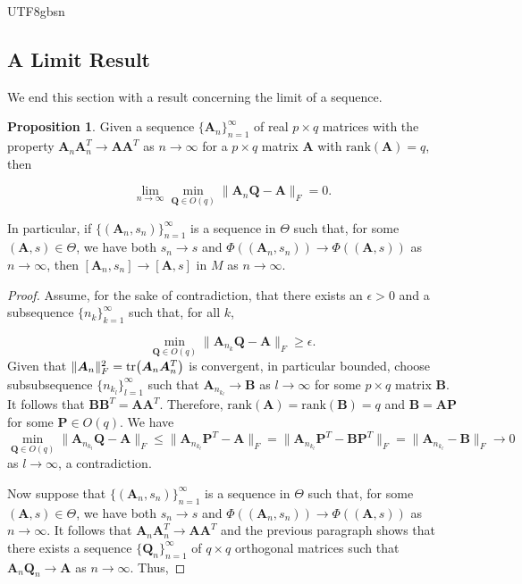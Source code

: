 \documentclass[12pt]{report}
\theoremstyle{plain}
\theoremstyle{definition}
\newtheorem{proposition}[theorem]{Proposition}
\begin{document}
\begin{CJK*}{UTF8}{gbsn}
\subsection{A Limit Result}
We end this section with a result concerning the limit of a sequence.

\begin{proposition}\label{thm:quotient_limit}
Given a sequence 
$\{\bm{A}_n\}_{n=1}^{\infty}$
of real $p \times q$ matrices
with the property $\bm{A}_n\bm{A}_n^T \to \bm{A}\bm{A}^T$
as $n \to \infty$
for a $p \times q$ matrix $\bm{A}$
with $\text{rank}(\bm{A}) = q$, 
then 

\begin{equation*}
  \lim_{n \to \infty} \min_{\bm{Q} \in O(q)} \|\bm{A}_n\bm{Q}- \bm{A}\|_F = 0.
\end{equation*}

In particular, if $\{(\bm{A}_n, s_n)\}_{n=1}^{\infty}$
is a sequence in $\Theta$ 
such that, for some $(\bm{A}, s) \in \Theta$,
we have both $s_n \to s$ and 
$\Phi((\bm{A}_n, s_n)) 
\to \Phi((\bm{A}, s))$ as $n \to \infty$,
then $[\bm{A}_n, s_n] \to [\bm{A}, s]$ in $M$ as $n \to \infty$.
\end{proposition}

\begin{proof}
Assume, for the sake of contradiction,
that there exists an $\epsilon > 0$ and a subsequence $\{n_k\}_{k=1}^{\infty}$
such that, for all $k$,

\begin{equation*}
  \min_{\bm{Q} \in O(q)} \|\bm{A}_{n_k}\bm{Q}- \bm{A}\|_F \geqslant \epsilon.
\end{equation*}
Given that $\|\bm{A}_{n}\|_F^2 = \tr(\bm{A}_{n}\bm{A}_{n}^T)$
is convergent, in particular bounded, 
choose subsubsequence $\{n_{k_l}\}_{l=1}^{\infty}$
such that $\bm{A}_{n_{k_l}} \to \bm{B}$ as $l \to \infty$
for some $p \times q$ matrix $\bm{B}$.
It follows that $\bm{B}\bm{B}^T = \bm{A}\bm{A}^T$.
Therefore, $\text{rank}(\bm{A}) = \text{rank}(\bm{B}) = q$
and $\bm{B} = \bm{A}\bm{P}$ for some $\bm{P} \in O(q)$.
We have 
\begin{equation*}
  \min_{\bm{Q} \in O(q)} \|\bm{A}_{n_{k_l}}\bm{Q}- \bm{A}\|_F \leqslant 
  \|\bm{A}_{n_{k_l}}\bm{P}^T- \bm{A}\|_F = \|\bm{A}_{n_{k_l}}\bm{P}^T- \bm{B}\bm{P}^T\|_F
  = \|\bm{A}_{n_{k_l}}- \bm{B}\|_F \to 0
\end{equation*}
as $l \to \infty$, a contradiction.

Now suppose that $\{(\bm{A}_n, s_n)\}_{n=1}^{\infty}$
is a sequence in $\Theta$ such that, 
for some $(\bm{A}, s) \in \Theta$,
we have both $s_n \to s$ and 
$\Phi((\bm{A}_n, s_n)) 
\to \Phi((\bm{A}, s))$ as $n \to \infty$.
It follows that $\bm{A}_n\bm{A}_n^T \to \bm{A}\bm{A}^T$
and the previous paragraph shows that 
there exists a sequence $\{\bm{Q}_n\}_{n=1}^{\infty}$
of $q \times q$ orthogonal matrices 
such that $\bm{A}_n \bm{Q}_n \to \bm{A}$ 
as $n \to \infty$.
Thus,


\end{proof}
\end{CJK*}
\end{document}
